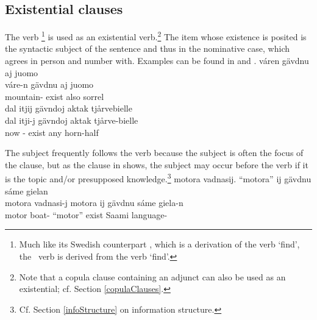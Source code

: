 \subsection{Existential clauses}\label{existentialClauses}
The verb \footnote{Much like its Swedish counterpart %
, which is a derivation of the verb  ‘find’, the \PS\ verb  is derived from the verb  ‘find’.} 
is used as an existential verb.\footnote{Note that a copula clause containing an adjunct can also be used as an existential; cf. Section \ref{copulaClauses}.} 
The item whose existence is posited is the syntactic subject of the sentence and thus in the nominative case, which  agrees in person and number with. 
Examples can be found in  and .%
\ea\label{existential1}
\glll	váren gävdnu aj juomo\\
	váre-n gävdnu aj juomo\\
	mountain- exist\BS{} also sorrel\BS{}\\\nopagebreak
{} 
\z
\ea\label{existential2}
\glll	dal itjij gävndoj aktak tjårvebielle\\
	dal itji-j gävndoj aktak tjårve-bielle\\
	now - exist\BS{} any horn-half\BS{}\\\nopagebreak
{} 
\z
{} 

The subject frequently follows the verb because the subject is often the focus of the clause, but as the clause in  shows, the subject may occur before the verb if it is the topic and/or presupposed knowledge.\footnote{Cf. Section \ref{infoStructure} on information structure.}
\ea\label{existential3}
\glll	motora vadnasij. “motora” ij gävdnu sáme gielan\\
	motora vadnasi-j motora ij gävdnu sáme giela-n\\
	motor\BS{} boat- “motor” \BS{} exist\BS{} Saami\BS{} language-\\\nopagebreak
{} 
\z



